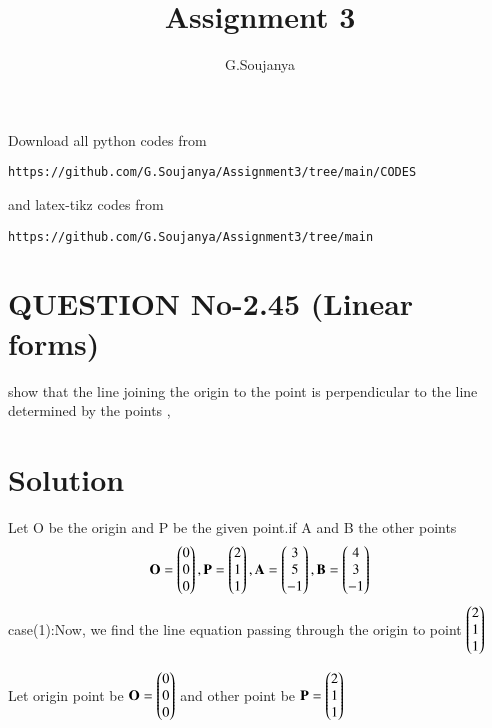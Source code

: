 \documentclass[journal,12pt,twocolumn]{IEEEtran}
\begin{document}
     \def\rightbox#1{\makebox[0in][r]{#1}}
     \def\centbox#1{\makebox[0in]{#1}}
     \def\topbox#1{\raisebox{-\baselineskip}[0in][0in]{#1}}
     \def\midbox#1{\raisebox{-0.5\baselineskip}[0in][0in]{#1}}
\vspace{3cm}
\title{Assignment 3}
\author{G.Soujanya}
\maketitle
\newpage
\bigskip
\renewcommand{\thefigure}{\theenumi}
\renewcommand{\thetable}{\theenumi}
Download all python codes from 
\begin{lstlisting}
https://github.com/G.Soujanya/Assignment3/tree/main/CODES
\end{lstlisting}
%
and latex-tikz codes from 
%
\begin{lstlisting}
https://github.com/G.Soujanya/Assignment3/tree/main
\end{lstlisting}
%
%
\section{QUESTION No-2.45 (Linear forms)}
show that the line joining the origin to the  point  is perpendicular to the line determined by the points , 
%
\section{Solution}
Let O be the origin and P be the given point.if A and B the other points
\begin{align}
 \mathbf{O}=\begin{pmatrix}0\\0\\0\end{pmatrix}, 
 \mathbf{P}=\begin{pmatrix}2\\1\\1\end{pmatrix} ,\mathbf{A}=\begin{pmatrix}3\\5\\-1\end{pmatrix} ,\mathbf{B}=\begin{pmatrix}4\\3\\-1\end{pmatrix}  
\end{align}
case(1):Now, we find the line equation passing through the origin to point $\begin{pmatrix}2\\1\\1\end{pmatrix}$

Let origin point be $\mathbf{O}=\begin{pmatrix}0\\0\\0\end{pmatrix}$ and other point be $\mathbf{P}=\begin{pmatrix}2\\1\\1\end{pmatrix}$
\end{document}
